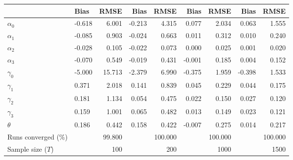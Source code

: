 
\begin{tabular}[t]{llrrrrrrr}
\toprule
  & Bias & RMSE & Bias & RMSE & Bias & RMSE & Bias & RMSE\\
\midrule
$\alpha_{0}$ & -0.618 & 6.001 & -0.213 & 4.315 & 0.077 & 2.034 & 0.063 & 1.555\\
$\alpha_{1}$ & -0.085 & 0.903 & -0.024 & 0.663 & 0.011 & 0.312 & 0.010 & 0.240\\
$\alpha_{2}$ & -0.028 & 0.105 & -0.022 & 0.073 & 0.000 & 0.025 & 0.001 & 0.020\\
$\alpha_{3}$ & -0.070 & 0.549 & -0.019 & 0.431 & -0.001 & 0.185 & 0.004 & 0.152\\
$\gamma_{0}$ & -5.000 & 15.713 & -2.379 & 6.990 & -0.375 & 1.959 & -0.398 & 1.533\\
$\gamma_{1}$ & 0.371 & 2.018 & 0.141 & 0.839 & 0.045 & 0.229 & 0.044 & 0.175\\
$\gamma_{2}$ & 0.181 & 1.134 & 0.054 & 0.475 & 0.022 & 0.150 & 0.027 & 0.120\\
$\gamma_{3}$ & 0.159 & 1.001 & 0.065 & 0.482 & 0.013 & 0.149 & 0.023 & 0.121\\
$\theta$ & 0.186 & 0.442 & 0.158 & 0.422 & -0.007 & 0.275 & 0.014 & 0.217\\
Runs converged (\%) &  & 99.800 &  & 100.000 &  & 100.000 &  & 100.000\\
Sample size ($T$) &  & 100 &  & 200 &  & 1000 &  & 1500\\
\bottomrule
\end{tabular}
